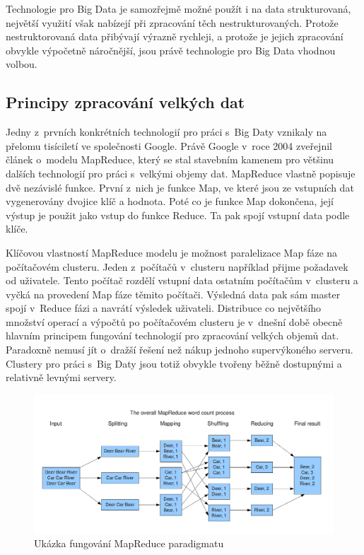\documentclass[thesis=B,czech]{FITthesis}[2012/06/26]
\begin{document}
	Technologie pro Big Data je samozřejmě možné použít i na data strukturovaná, největší využití však nabízejí při zpracování těch nestrukturovaných. Protože nestruktorovaná data přibývají výrazně rychleji\cite{structured-unstructured}, a protože je jejich zpracování obvykle výpočetně náročnější, jsou právě technologie pro Big Data vhodnou volbou. 
 
	
\subsection{Principy zpracování velkých dat}
	Jedny z~prvních konkrétních technologií pro práci s~Big Daty vznikaly na přelomu tisíciletí ve společnosti Google. Právě Google v~roce 2004 zveřejnil článek o~modelu MapReduce\cite{mapreduce-google}, který se stal stavebním kamenem pro většinu dalších technologií pro práci s~velkými objemy dat. MapReduce vlastně popisuje dvě nezávislé funkce. První z~nich je funkce Map, ve které jsou ze vstupních dat vygenerovány dvojice klíč a hodnota. Poté co je funkce Map dokončena, její výstup je použit jako vstup do funkce Reduce. Ta pak spojí vstupní data podle klíče\cite{mapreduce-description}. 
	
	Klíčovou vlastností MapReduce modelu je možnost paralelizace Map fáze na počítačovém clusteru. Jeden z~počítačů v~clusteru například přijme požadavek od uživatele. Tento počítač rozdělí vstupní data ostatním počítačům v~clusteru a vyčká na provedení Map fáze těmito počítači. Výsledná data pak sám master spojí v~Reduce fázi a navrátí výsledek uživateli. Distribuce co největšího množství operací a výpočtů po počítačovém clusteru je v~dnešní době obecně hlavním principem fungování technologií pro zpracování velkých objemů dat. Paradoxně nemusí jít o~dražší řešení než nákup jednoho supervýkoného serveru. Clustery pro práci s~Big Daty jsou totiž obvykle tvořeny běžně dostupnými a relativně levnými servery. 
	
	\begin{figure}[ht]
    	\centering
    	\includegraphics[width=1\textwidth]{images/mapreduce.png}
    	\caption{Ukázka fungování MapReduce paradigmatu \cite{mapreduce-img} }
    	\label{fig:mapreduce}
	\end{figure}
	
\end{document}
